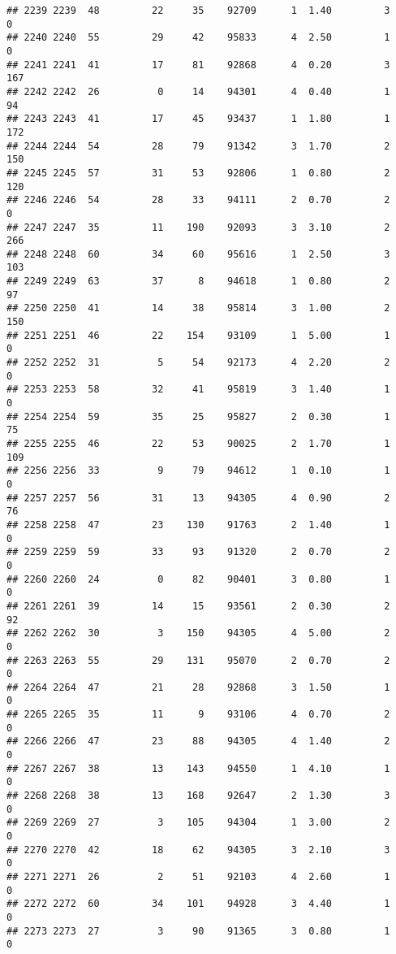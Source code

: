 \documentclass[
]{article}
\begin{document}
\begin{verbatim}
## 2239 2239  48         22     35    92709      1  1.40         3        0
## 2240 2240  55         29     42    95833      4  2.50         1        0
## 2241 2241  41         17     81    92868      4  0.20         3      167
## 2242 2242  26          0     14    94301      4  0.40         1       94
## 2243 2243  41         17     45    93437      1  1.80         1      172
## 2244 2244  54         28     79    91342      3  1.70         2      150
## 2245 2245  57         31     53    92806      1  0.80         2      120
## 2246 2246  54         28     33    94111      2  0.70         2        0
## 2247 2247  35         11    190    92093      3  3.10         2      266
## 2248 2248  60         34     60    95616      1  2.50         3      103
## 2249 2249  63         37      8    94618      1  0.80         2       97
## 2250 2250  41         14     38    95814      3  1.00         2      150
## 2251 2251  46         22    154    93109      1  5.00         1        0
## 2252 2252  31          5     54    92173      4  2.20         2        0
## 2253 2253  58         32     41    95819      3  1.40         1        0
## 2254 2254  59         35     25    95827      2  0.30         1       75
## 2255 2255  46         22     53    90025      2  1.70         1      109
## 2256 2256  33          9     79    94612      1  0.10         1        0
## 2257 2257  56         31     13    94305      4  0.90         2       76
## 2258 2258  47         23    130    91763      2  1.40         1        0
## 2259 2259  59         33     93    91320      2  0.70         2        0
## 2260 2260  24          0     82    90401      3  0.80         1        0
## 2261 2261  39         14     15    93561      2  0.30         2       92
## 2262 2262  30          3    150    94305      4  5.00         2        0
## 2263 2263  55         29    131    95070      2  0.70         2        0
## 2264 2264  47         21     28    92868      3  1.50         1        0
## 2265 2265  35         11      9    93106      4  0.70         2        0
## 2266 2266  47         23     88    94305      4  1.40         2        0
## 2267 2267  38         13    143    94550      1  4.10         1        0
## 2268 2268  38         13    168    92647      2  1.30         3        0
## 2269 2269  27          3    105    94304      1  3.00         2        0
## 2270 2270  42         18     62    94305      3  2.10         3        0
## 2271 2271  26          2     51    92103      4  2.60         1        0
## 2272 2272  60         34    101    94928      3  4.40         1        0
## 2273 2273  27          3     90    91365      3  0.80         1        0

\end{verbatim}
\end{document}
